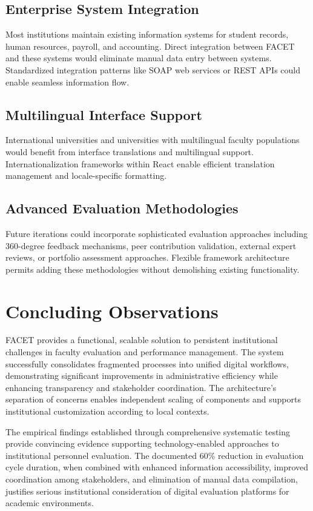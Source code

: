 \documentclass[conference]{IEEEtran}
\begin{document}
\subsection{Enterprise System Integration}
Most institutions maintain existing information systems for student records, human resources, payroll, and accounting. Direct integration between FACET and these systems would eliminate manual data entry between systems. Standardized integration patterns like SOAP web services or REST APIs could enable seamless information flow.

\subsection{Multilingual Interface Support}
International universities and universities with multilingual faculty populations would benefit from interface translations and multilingual support. Internationalization frameworks within React enable efficient translation management and locale-specific formatting.

\subsection{Advanced Evaluation Methodologies}
Future iterations could incorporate sophisticated evaluation approaches including 360-degree feedback mechanisms, peer contribution validation, external expert reviews, or portfolio assessment approaches. Flexible framework architecture permits adding these methodologies without demolishing existing functionality.

\section{Concluding Observations}
\label{sec:conclusion}

FACET provides a functional, scalable solution to persistent institutional challenges in faculty evaluation and performance management. The system successfully consolidates fragmented processes into unified digital workflows, demonstrating significant improvements in administrative efficiency while enhancing transparency and stakeholder coordination. The architecture's separation of concerns enables independent scaling of components and supports institutional customization according to local contexts.

The empirical findings established through comprehensive systematic testing provide convincing evidence supporting technology-enabled approaches to institutional personnel evaluation. The documented 60\% reduction in evaluation cycle duration, when combined with enhanced information accessibility, improved coordination among stakeholders, and elimination of manual data compilation, justifies serious institutional consideration of digital evaluation platforms for academic environments.
\end{document}
